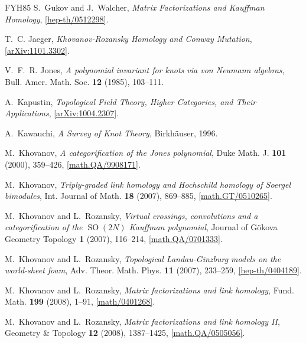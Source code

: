 \documentclass{compositio}
\theoremstyle{definition}
\numberwithin{equation}{section}
\begin{document}
\begin{thebibliography}{FYH{\etalchar{+}}85}
S.~Gukov and J.~Walcher, \emph{Matrix {F}actorizations and {K}auffman
  {H}omology}, \href{http://arxiv.org/abs/hep-th/0512298}{[hep-th/0512298]}.

T.~C. Jaeger, \emph{Khovanov-{R}ozansky {H}omology and {C}onway {M}utation},
  \href{http://arxiv.org/abs/1101.3302}{[arXiv:1101.3302]}.

V.~F.~R. Jones, \emph{A polynomial invariant for knots via von {N}eumann
  algebras}, Bull. Amer. Math. Soc. \textbf{12} (1985), 103--111.

A.~Kapustin, \emph{Topological {F}ield {T}heory, {H}igher {C}ategories, and
  {T}heir {A}pplications},
  \href{http://arxiv.org/abs/1004.2307}{[arXiv:1004.2307]}.

A.~Kawauchi, \emph{A {S}urvey of {K}not {T}heory}, Birkh\"auser, 1996.

M.~Khovanov, \emph{A categorification of the {J}ones polynomial}, Duke Math. J.
  \textbf{101} (2000), 359--426,
  \href{http://arxiv.org/abs/math/9908171}{[math.QA/9908171]}.

M.~Khovanov, \emph{Triply-graded link homology and Hochschild homology of Soergel bimodules},
  Int. Journal of Math. \textbf{18} (2007), 869--885,
  \href{http://arxiv.org/abs/math/0510265}{[math.GT/0510265]}.

M.~Khovanov and L.~Rozansky, \emph{Virtual crossings, convolutions and a
  categorification of the {$\operatorname{SO}(2N)$} {K}auffman polynomial},
  Journal of G\"okova Geometry Topology \textbf{1} (2007), 116--214,
  \href{http://arxiv.org/abs/math/0701333}{[math.QA/0701333]}.

M.~Khovanov and L.~Rozansky, \emph{Topological Landau-Ginzburg models on the world-sheet foam},
  Adv. Theor. Math. Phys. \textbf{11} (2007), 233--259,
  \href{http://arxiv.org/abs/hep-th/0404189}{[hep-th/0404189]}.

M.~Khovanov and L.~Rozansky, \emph{Matrix factorizations and link homology}, Fund. Math.
  \textbf{199} (2008), 1--91,
  \href{http://arxiv.org/abs/math/0401268}{[math/0401268]}.

M.~Khovanov and L.~Rozansky, \emph{Matrix factorizations and link homology {II}}, Geometry \&
  Topology \textbf{12} (2008), 1387--1425,
  \href{http://arxiv.org/abs/math/0505056}{[math.QA/0505056]}.


\end{thebibliography}
\end{document}

